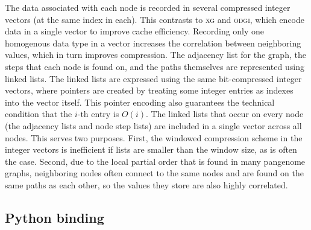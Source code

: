 \documentclass{bioinfo}
\begin{document}
\begin{methods}
The data associated with each node is recorded in several compressed integer vectors (at the same index in each).
This contrasts to \textsc{xg} and \textsc{odgi}, which encode data in a single vector to improve cache efficiency.
Recording only one homogenous data type in a vector increases the correlation between neighboring values, which in turn improves compression.
The adjacency list for the graph, the steps that each node is found on, and the paths themselves are represented using linked lists.
The linked lists are expressed using the same bit-compressed integer vectors, where pointers are created by treating some integer entries as indexes into the vector itself.
This pointer encoding also guarantees the technical condition that the $i$-th entry is $O(i)$.
The linked lists that occur on every node (the adjacency lists and node step lists) are included in a single vector across all nodes.
This serves two purposes.
First, the windowed compression scheme in the integer vectors is inefficient if lists are smaller than the window size, as is often the case.
Second, due to the local partial order that is found in many pangenome graphs, neighboring nodes often connect to the same nodes and are found on the same paths as each other, so the values they store are also highly correlated.


\subsection{Python binding}


\end{methods}
\end{document}
